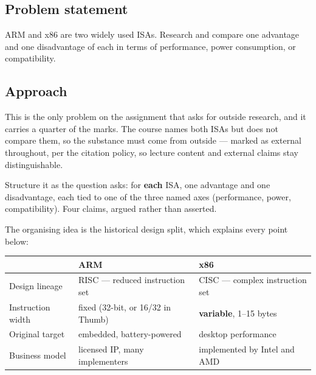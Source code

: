 





\subsection*{Problem statement}

ARM and x86 are two widely used ISAs. Research and compare one advantage and one
disadvantage of each in terms of performance, power consumption, or
compatibility.

\subsection*{Approach}

This is the only problem on the assignment that asks for outside research, and
it carries a quarter of the marks. The course names both ISAs
 but does not compare them, so the
substance must come from outside — marked as external throughout, per the
citation policy, so lecture content and external claims stay distinguishable.

Structure it as the question asks: for \textbf{each} ISA, one advantage and one
disadvantage, each tied to one of the three named axes (performance, power,
compatibility). Four claims, argued rather than asserted.

The organising idea is the historical design split, which explains every point
below:

\begin{center}
\begin{tabular}{lll}
  \toprule
  & \textbf{ARM} & \textbf{x86} \\
  \midrule
  Design lineage    & RISC — reduced instruction set & CISC — complex instruction set \\
  Instruction width & fixed (32-bit, or 16/32 in Thumb) & \textbf{variable}, 1--15 bytes \\
  Original target   & embedded, battery-powered & desktop performance \\
  Business model    & licensed IP, many implementers & implemented by Intel and AMD \\
  \bottomrule
\end{tabular}
\end{center}

